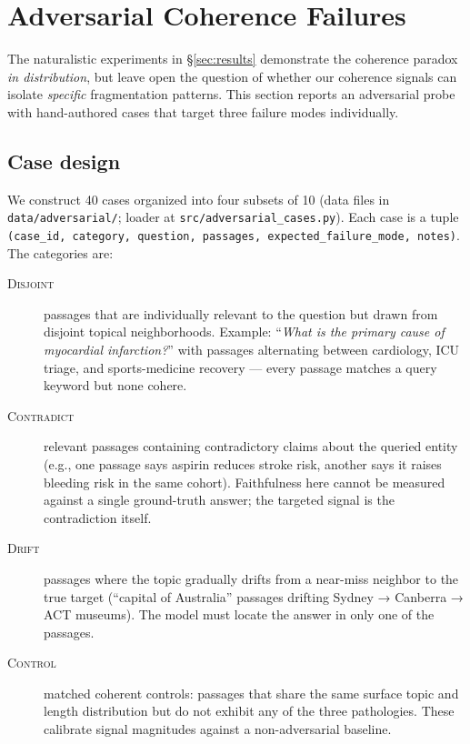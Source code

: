 \section{Adversarial Coherence Failures}
\label{sec:adversarial}

The naturalistic experiments in §\ref{sec:results} demonstrate the
coherence paradox \emph{in distribution}, but leave open the question of
whether our coherence signals can isolate \emph{specific} fragmentation
patterns. This section reports an adversarial probe with hand-authored
cases that target three failure modes individually.

\subsection{Case design}

We construct 40 cases organized into four subsets of 10 (data files in
\texttt{data/adversarial/}; loader at \texttt{src/adversarial\_cases.py}).
Each case is a tuple \texttt{(case\_id, category, question, passages,
expected\_failure\_mode, notes)}. The categories are:

\begin{description}
  \item[\textsc{Disjoint}] passages that are individually relevant to the
        question but drawn from disjoint topical neighborhoods. Example:
        ``\emph{What is the primary cause of myocardial infarction?}''
        with passages alternating between cardiology, ICU triage, and
        sports-medicine recovery — every passage matches a query keyword
        but none cohere.
  \item[\textsc{Contradict}] relevant passages containing contradictory
        claims about the queried entity (e.g., one passage says aspirin
        reduces stroke risk, another says it raises bleeding risk in the
        same cohort). Faithfulness here cannot be measured against a
        single ground-truth answer; the targeted signal is the
        contradiction itself.
  \item[\textsc{Drift}] passages where the topic gradually drifts from a
        near-miss neighbor to the true target (``capital of Australia''
        passages drifting Sydney → Canberra → ACT museums). The model
        must locate the answer in only one of the passages.
  \item[\textsc{Control}] matched coherent controls: passages that share
        the same surface topic and length distribution but do not exhibit
        any of the three pathologies. These calibrate signal magnitudes
        against a non-adversarial baseline.
\end{description}

